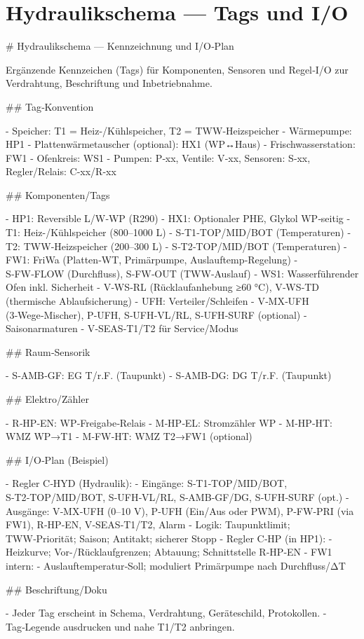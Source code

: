\documentclass[11pt,oneside]{report}
\begin{document}
\chapter{Hydraulikschema — Tags und I/O}
\begin{markdown}
# Hydraulikschema — Kennzeichnung und I/O‑Plan

Ergänzende Kennzeichen (Tags) für Komponenten, Sensoren und Regel‑I/O zur Verdrahtung, Beschriftung und Inbetriebnahme.

## Tag‑Konvention

- Speicher: T1 = Heiz-/Kühlspeicher, T2 = TWW‑Heizspeicher
- Wärmepumpe: HP1
- Plattenwärmetauscher (optional): HX1 (WP↔Haus)
- Frischwasserstation: FW1
- Ofenkreis: WS1
- Pumpen: P‑xx, Ventile: V‑xx, Sensoren: S‑xx, Regler/Relais: C‑xx/R‑xx

## Komponenten/Tags

- HP1: Reversible L/W‑WP (R290)
- HX1: Optionaler PHE, Glykol WP‑seitig
- T1: Heiz-/Kühlspeicher (800–1000 L)
  - S‑T1‑TOP/MID/BOT (Temperaturen)
- T2: TWW‑Heizspeicher (200–300 L)
  - S‑T2‑TOP/MID/BOT (Temperaturen)
- FW1: FriWa (Platten‑WT, Primärpumpe, Auslauftemp‑Regelung)
  - S‑FW‑FLOW (Durchfluss), S‑FW‑OUT (TWW‑Auslauf)
- WS1: Wasserführender Ofen inkl. Sicherheit
  - V‑WS‑RL (Rücklaufanhebung ≥60 °C), V‑WS‑TD (thermische Ablaufsicherung)
- UFH: Verteiler/Schleifen
  - V‑MX‑UFH (3‑Wege‑Mischer), P‑UFH, S‑UFH‑VL/RL, S‑UFH‑SURF (optional)
- Saisonarmaturen
  - V‑SEAS‑T1/T2 für Service/Modus

## Raum‑Sensorik

- S‑AMB‑GF: EG T/r.F. (Taupunkt)
- S‑AMB‑DG: DG T/r.F. (Taupunkt)

## Elektro/Zähler

- R‑HP‑EN: WP‑Freigabe‑Relais
- M‑HP‑EL: Stromzähler WP
- M‑HP‑HT: WMZ WP→T1
- M‑FW‑HT: WMZ T2→FW1 (optional)

## I/O‑Plan (Beispiel)

- Regler C‑HYD (Hydraulik):
  - Eingänge: S‑T1‑TOP/MID/BOT, S‑T2‑TOP/MID/BOT, S‑UFH‑VL/RL, S‑AMB‑GF/DG, S‑UFH‑SURF (opt.)
  - Ausgänge: V‑MX‑UFH (0–10 V), P‑UFH (Ein/Aus oder PWM), P‑FW‑PRI (via FW1), R‑HP‑EN, V‑SEAS‑T1/T2, Alarm
  - Logik: Taupunktlimit; TWW‑Priorität; Saison; Antitakt; sicherer Stopp
- Regler C‑HP (in HP1):
  - Heizkurve; Vor-/Rücklaufgrenzen; Abtauung; Schnittstelle R‑HP‑EN
- FW1 intern:
  - Auslauftemperatur‑Soll; moduliert Primärpumpe nach Durchfluss/ΔT

## Beschriftung/Doku

- Jeder Tag erscheint in Schema, Verdrahtung, Geräteschild, Protokollen.
- Tag‑Legende ausdrucken und nahe T1/T2 anbringen.
\end{markdown}
\end{document}
